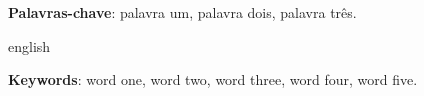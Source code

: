 \begin{resumoumacoluna}

    \lipsum[1-3]

    \vspace{\onelineskip}

    \noindent
    \textbf{Palavras-chave}: palavra um, palavra dois, palavra três.
\end{resumoumacoluna}

\renewcommand{\resumoname}{Abstract}
\begin{resumoumacoluna}
    \begin{otherlanguage*}{english}

        \lipsum[4-6]

        \vspace{\onelineskip}

        \noindent
        \textbf{Keywords}: word one, word two, word three, word four, word five.
    \end{otherlanguage*}
\end{resumoumacoluna}
